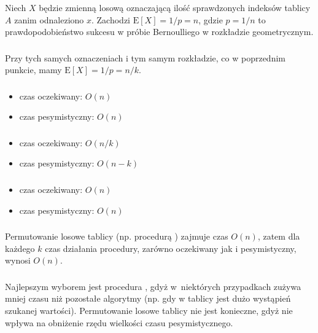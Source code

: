 \subsubsection{} %
Niech $X$ będzie zmienną losową oznaczającą ilość sprawdzonych indeksów tablicy $A$ zanim odnaleziono $x$. Zachodzi $\mathrm{E}[X]=1/p=n$, gdzie $p=1/n$ to prawdopodobieństwo sukcesu w próbie Bernoulliego w rozkładzie geometrycznym.

\subsubsection{} %
Przy tych samych oznaczeniach i tym samym rozkładzie, co w poprzednim punkcie, mamy $\mathrm{E}[X]=1/p=n/k$.

\subsubsection{} %

\subsubsection{} %
\begin{itemize}
	\item czas oczekiwany: $O(n)$
	\item czas pesymistyczny: $O(n)$
\end{itemize}

\subsubsection{} %
\begin{itemize}
	\item czas oczekiwany: $O(n/k)$
	\item czas pesymistyczny: $O(n-k)$
\end{itemize}

\subsubsection{} %
\begin{itemize}
	\item czas oczekiwany: $O(n)$
	\item czas pesymistyczny: $O(n)$
\end{itemize}

\subsubsection{} %
Permutowanie losowe tablicy (np. procedurą ) zajmuje czas $O(n)$, zatem dla każdego $k$ czas działania procedury, zarówno oczekiwany jak i pesymistyczny, wynosi $O(n)$.

\subsubsection{} %
Najlepszym wyborem jest procedura , gdyż w~niektórych przypadkach zużywa mniej czasu niż pozostałe algorytmy (np. gdy w tablicy jest dużo wystąpień szukanej wartości). Permutowanie losowe tablicy nie jest konieczne, gdyż nie wpływa na obniżenie rzędu wielkości czasu pesymistycznego.

